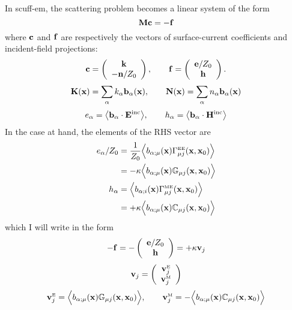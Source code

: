 \documentclass[letterpaper]{article}
\begin{document}
In {\sc scuff-em}, the scattering problem becomes a linear 
system of the form 
$$ \mathbf{M} \mathbf{c} = -\mathbf{f} $$
where $\mathbf{c}$ and $\mathbf{f}$ are respectively the vectors of 
surface-current coefficients and incident-field projections:
$$ \mathbf{c} = 
   \left(\begin{array}{c} \mathbf{k} \\ -\mathbf{n}/Z_0 \end{array}\right)
   ,\qquad 
   \mathbf{f} =
   \left(\begin{array}{c} \mathbf{e}/Z_0 \\ \mathbf{h} \end{array}\right).
$$
$$ \mathbf{K}(\mathbf{x})=\sum_{\alpha} k_\alpha \mathbf{b}_\alpha(\mathbf{x}), \qquad 
   \mathbf{N}(\mathbf{x})=\sum_{\alpha} n_\alpha \mathbf{b}_\alpha(\mathbf{x})
$$
$$ e_\alpha = \big\langle \mathbf{b}_\alpha \cdot \mathbf{E}^{\hbox{\scriptsize{inc}}} \big\rangle,
   \qquad 
   h_\alpha = \big\langle \mathbf{b}_\alpha \cdot \mathbf{H}^{\hbox{\scriptsize{inc}}} \big\rangle
$$
In the case at hand, the elements of the RHS vector are
\begin{align*}
  e_\alpha/Z_0
 &= \frac{1}{Z_0} 
     \Big\langle b_{\alpha;\mu}(\mathbf{x}) \Gamma^{\hbox{\tiny{EE}}}_{\mu j}(\mathbf{x}, \mathbf{x}_0) \Big\rangle
\\
 &= -\kappa \Big\langle b_{\alpha;\mu}(\mathbf{x}) \mathbb{G}_{\mu j}(\mathbf{x}, \mathbf{x}_0) \Big\rangle
\\
  h_\alpha
 &= \Big\langle b_{\alpha;i}(\mathbf{x}) \Gamma^{\hbox{\tiny{ME}}}_{\mu j}(\mathbf{x}, \mathbf{x}_0) \Big\rangle
\\
 &= +\kappa \Big\langle b_{\alpha;\mu}(\mathbf{x}) \mathbb{C}_{\mu j}(\mathbf{x}, \mathbf{x}_0) \Big\rangle
\end{align*}
which I will write in the form
$$ -\mathbf{f} = -\left(\begin{array}{c} \mathbf{e}/Z_0 \\ \mathbf{h} \end{array}\right)
   = +\kappa \mathbf{v}_j
$$
$$ \mathbf{v}_j = \left(\begin{array}{c}
   \mathbf{v}^{\hbox{\tiny{E}}}_j \\  \mathbf{v}^{\hbox{\tiny{M}}}_j
   \end{array}\right)
$$
$$ \mathbf{v}^{\hbox{\tiny{E}}}_j 
    = \Big\langle b_{\alpha;\mu}(\mathbf{x}) \mathbb{G}_{\mu j}(\mathbf{x}, \mathbf{x}_0) \Big\rangle,
\qquad 
   \mathbf{v}^{\hbox{\tiny{M}}}_j 
    = -\Big\langle b_{\alpha;\mu}(\mathbf{x}) \mathbb{C}_{\mu j}(\mathbf{x}, \mathbf{x}_0) \Big\rangle
$$
\end{document}
